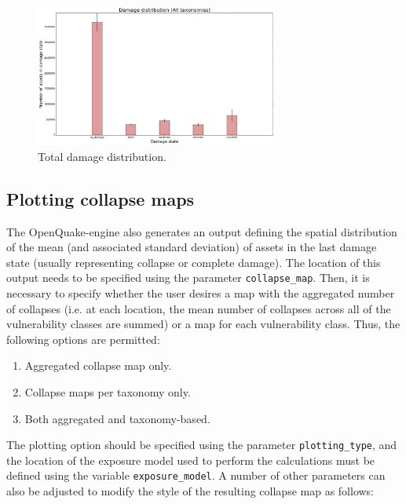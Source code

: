 \begin{figure}[htb]
  \centering
      \includegraphics[width=8cm]{Figures/total_damage_dist.png}
  \caption{Total damage distribution.}
  \label{fig:total_dmg}
\end{figure}

\subsection{Plotting collapse maps}
\label{subsec:plot-collapse_maps}

The OpenQuake-engine also generates an output defining the spatial distribution of the mean (and associated standard deviation) of assets in the last damage state (usually representing collapse or complete damage). The location of this output needs to be specified using the parameter \verb=collapse_map=. Then, it is necessary to specify whether the user desires a map with the aggregated number of collapses (i.e. at each location, the mean number of collapses across all of the vulnerability classes are summed) or a map for each vulnerability class. Thus, the following options are permitted:\\

\begin{enumerate}
\item Aggregated collapse map only.
\item Collapse maps per taxonomy only.
\item Both aggregated and taxonomy-based.\\
\end{enumerate}

The plotting option should be specified using the parameter \verb=plotting_type=, and the location of the exposure model used to perform the calculations must be defined using the variable \verb=exposure_model=. A number of other parameters can also be adjusted to modify the style of the resulting collapse map as follows:\\

